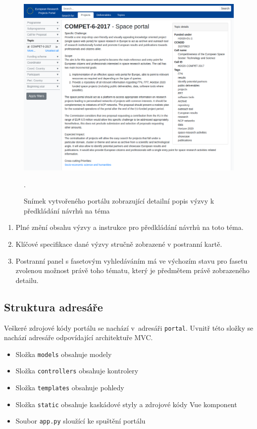 \begin{figure}[H]
	\centering
	\includegraphics[width=\textwidth]{obrazky-figures/my-topic.png}
	\caption{Snímek vytvořeného portálu zobrazující detailní popis výzvy k předkládání návrhů na téma }.
	\label{image:portal-detail}
\end{figure}
\begin{enumerate}
    \item Plné znění obsahu výzvy a instrukce pro předkládání návrhů na toto téma.
    \item Klíčové specifikace dané výzvy stručně zobrazené v postranní kartě.
    \item Postranní panel s fasetovým vyhledáváním má ve výchozím stavu pro fasetu  zvolenou možnost právě toho tématu, který je předmětem právě zobrazeného detailu.
\end{enumerate}

\blindtext[2]

\subsection{Struktura adresáře}
Veškeré zdrojové kódy portálu se nachází v~adresáři \texttt{portal}. Uvnitř této složky se nachází adresáře odpovídající architektuře MVC.
\begin{itemize}
  \item Složka \texttt{models} obsahuje modely
  \item Složka \texttt{controllers} obsahuje kontrolery
  \item Složka \texttt{templates} obsahuje pohledy
  \item Složka \texttt{static} obsahuje kaskádové styly a zdrojové kódy Vue komponent
  \item Soubor \texttt{app.py} sloužící ke spuštění portálu
\end{itemize}

